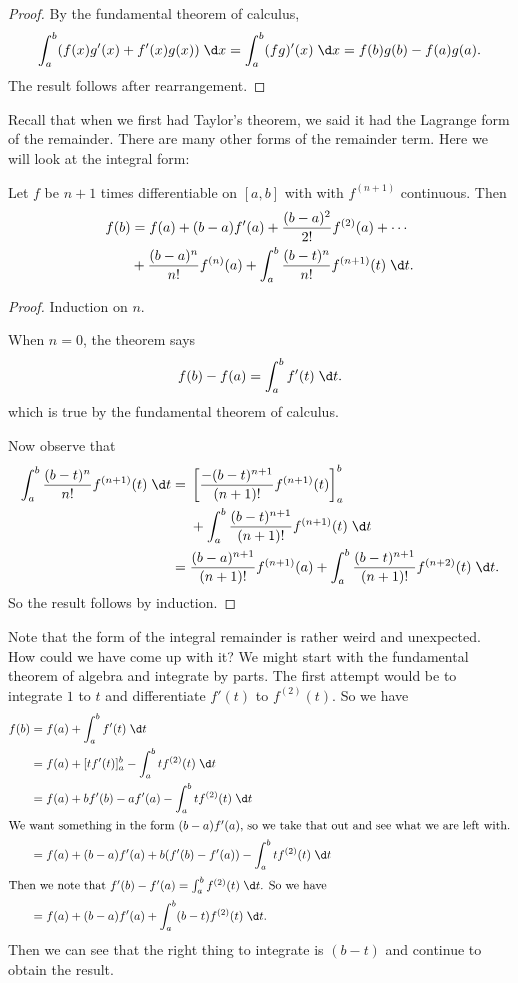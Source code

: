 \documentclass[a4paper]{article}
\begin{document}
\begin{proof}
  By the fundamental theorem of calculus,
  \[
    \int_a^b (f(x)g'(x) + f'(x)g(x))\;\d x = \int_a^b(fg)'(x)\;\d x = f(b)g(b) - f(a)g(a).
  \]
  The result follows after rearrangement.
\end{proof}

Recall that when we first had Taylor's theorem, we said it had the Lagrange form of the remainder. There are many other forms of the remainder term. Here we will look at the integral form:
\begin{thm}
  Let $f$ be $n + 1$ times differentiable on $[a, b]$ with with $f^{(n + 1)}$ continuous. Then
  \begin{align*}
    f(b) &= f(a) + (b - a)f'(a) + \frac{(b - a)^2}{2!}f^{(2)}(a) + \cdots \\
    &+ \frac{(b - a)^n}{n!}f^{(n)}(a) + \int_a^b \frac{(b - t)^n}{n!}f^{(n + 1)}(t)\;\d t.
  \end{align*}
\end{thm}
\begin{proof}
  Induction on $n$.

  When $n = 0$, the theorem says
  \[
    f(b) - f(a) = \int_a^b f'(t)\;\d t.
  \]
  which is true by the fundamental theorem of calculus.

  Now observe that
  \begin{align*}
    \int_a^b \frac{(b - t)^n}{n!}f^{(n + 1)}(t)\;\d t ={}& \left[\frac{-(b - t)^{n + 1}}{(n + 1)!}f^{(n + 1)}(t)\right]_a^b\\
    &+ \int_a^b \frac{(b - t)^{n + 1}}{(n + 1)!}f^{(n + 1)}(t)\;\d t \\
    ={}& \frac{(b - a)^{n + 1}}{(n + 1)!} f^{(n + 1)}(a) + \int_a^b \frac{(b - t)^{n + 1}}{(n + 1)!}f^{(n + 2)}(t)\;\d t.
  \end{align*}
  So the result follows by induction.
\end{proof}
Note that the form of the integral remainder is rather weird and unexpected. How could we have come up with it? We might start with the fundamental theorem of algebra and integrate by parts. The first attempt would be to integrate $1$ to $t$ and differentiate $f'(t)$ to $f^{(2)}(t)$. So we have
\begin{align*}
  f(b) &= f(a) + \int_a^b f'(t)\;\d t\\
  &= f(a) + [tf'(t)]_a^b - \int_a^b tf^{(2)}(t)\;\d t\\
  &= f(a) + bf'(b) - af'(a) - \int_a^b tf^{(2)}(t)\;\d t\\
  \intertext{We want something in the form $(b - a)f'(a)$, so we take that out and see what we are left with.}
  &= f(a) + (b - a)f'(a) + b(f'(b) - f'(a)) - \int_a^b tf^{(2)}(t)\;\d t\\
  \intertext{Then we note that $f'(b) - f'(a) = \int_a^b f^{(2)}(t)\;\d t$. So we have}
  &= f(a) + (b - a)f'(a) + \int_a^b (b - t)f^{(2)}(t)\;\d t.
\end{align*}
Then we can see that the right thing to integrate is $(b - t)$ and continue to obtain the result.
\end{document}
